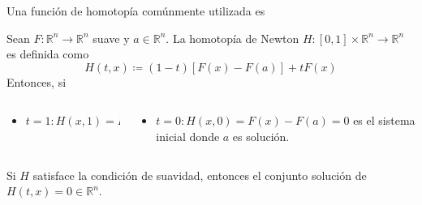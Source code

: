 \begin{frame}
	Una función de homotopía comúnmente utilizada es
	\begin{definition}
		Sean
		\begin{math}
			F\colon\mathbb{R}^{n}\to\mathbb{R}^{n}
		\end{math}
		suave y $a\in\mathbb{R}^{n}$.
		La \alert{homotopía de Newton}
		\begin{math}
			H\colon
			\left[0,1\right]\times\mathbb{R}^{n}\to
			\mathbb{R}^{n}
		\end{math}
		es definida como
		\begin{equation}\label{eq:newtonhomotopy}
			H\left(t,x\right)\coloneqq
			\left(1-t\right)
			\left[
				F\left(x\right)-
				F\left(a\right)
				\right]+
			tF\left(x\right)
		\end{equation}
		Entonces, si
	\end{definition}

	\begin{columns}
		\begin{column}{0.28\textwidth}
			\begin{itemize}
				\item

				      \begin{math}
					      t=1:
					      H\left(x,1\right)=
					      F\left(x\right)=
					      0.
				      \end{math}
			\end{itemize}
		\end{column}
		\begin{column}{0.68\textwidth}
			\begin{itemize}
				\item

				      \begin{math}
					      t=0:
					      H\left(x,0\right)=
					      F\left(x\right)-F\left(a\right)=
					      0
				      \end{math}
				      es el sistema inicial donde $a$ es solución.
			\end{itemize}
		\end{column}
	\end{columns}

	Si $H$ satisface la condición de suavidad, entonces el
	conjunto solución de $H\left(t,x\right)=0\in\mathbb{R}^{n}$.


\end{frame}
